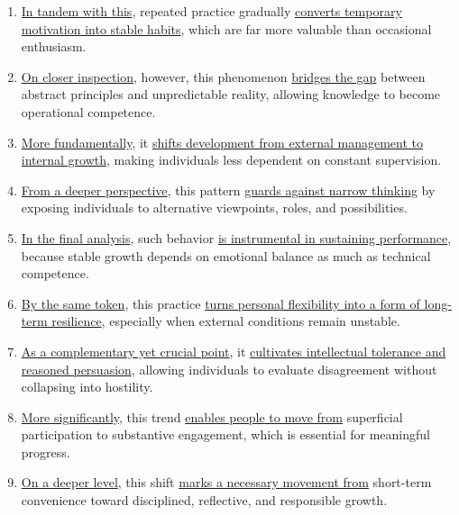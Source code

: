 \begin{enumerate}
    \item \underline{In tandem with this}, repeated practice gradually \underline{converts temporary motivation into stable habits}, which are far more valuable than occasional enthusiasm.
    \item \underline{On closer inspection}, however, this phenomenon \underline{bridges the gap} between abstract principles and unpredictable reality, allowing knowledge to become operational competence.
    \item \underline{More fundamentally}, it \underline{shifts development from external management to internal growth}, making individuals less dependent on constant supervision.
    \item \underline{From a deeper perspective}, this pattern \underline{guards against narrow thinking} by exposing individuals to alternative viewpoints, roles, and possibilities.
    \item \underline{In the final analysis}, such behavior \underline{is instrumental in sustaining performance}, because stable growth depends on emotional balance as much as technical competence.
    \item \underline{By the same token}, this practice \underline{turns personal flexibility into a form of long-term resilience}, especially when external conditions remain unstable.
    \item \underline{As a complementary yet crucial point}, it \underline{cultivates intellectual tolerance and reasoned persuasion}, allowing individuals to evaluate disagreement without collapsing into hostility.
    \item \underline{More significantly}, this trend \underline{enables people to move from} superficial participation to substantive engagement, which is essential for meaningful progress.
    \item \underline{On a deeper level}, this shift \underline{marks a necessary movement from} short-term convenience toward disciplined, reflective, and responsible growth.
\end{enumerate}

